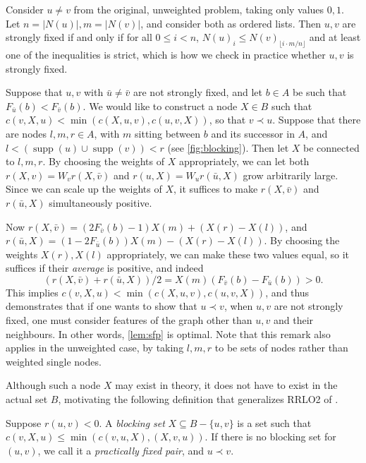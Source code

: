 \documentclass[a4paper,UKenglish,cleveref, autoref, thm-restate]{lipics-v2021}
\renewcommand{\b}{\prec}
\DeclareMathOperator{\supp}{supp}
\begin{document}
\begin{remark}
    Consider $u \neq v$ from the original, unweighted problem, taking only values $0, 1$. Let 
    $n = |N(u)|, m = |N(v)|$, and consider both as ordered lists. Then $u, v$ are strongly
    fixed if and only if for all $0 \leq i < n$, $N(u)_i \leq N(v)_{\lfloor i\cdot m/n
    \rfloor}$ and at least one of the inequalities is strict, which is how we check in practice
    whether $u, v$ is strongly fixed.
\end{remark}

\begin{remark}\label{rem:strongest}
    Suppose that $u, v$ with $\bar u \neq \bar v$ are not strongly fixed, and let $b \in A$ be
    such that $F_{\bar u}(b) < F_{\bar v}(b)$.
    We would like to construct a node $X\in B$ such that $c(v, X, u) < \min(c(X,
    u, v), c(u, v, X))$, so that $v\b u$.
    Suppose that there are nodes $l, m,
    r \in A$, with $m$ sitting between $b$ and its successor in $A$, and $l < (\supp(u) \cup
    \supp(v)) < r$ (see \cref{fig:blocking}). Then let $X$ be connected to $l, m, r$. By choosing
    the weights of $X$ appropriately, we can let both $r(X, v) = W_v r(X, \bar v)$ and $r(u, X)
    = W_u r(\bar u, X)$ grow arbitrarily large. Since we can scale up the weights of $X$, it
    suffices to make $r(X, \bar v)$ and $r(\bar u, X)$ simultaneously positive.

    Now $r(X, \bar v) = (2F_{\bar v}(b) - 1)X(m) + (X(r) - X(l))$, and $r(\bar u, X) = (1 -
    2F_{\bar u}(b))X(m) - (X(r) - X(l))$. By choosing the weights $X(r), X(l)$ appropriately, we can make
    these two values equal, so it suffices if their \emph{average} is positive, and indeed
    $${(r(X, \bar v) + r(\bar u, X))/2 = X(m)(F_{\bar v}(b) - F_{\bar u}(b)) > 0}.$$
    This implies $c(v, X, u) < \min(c(X, u, v), c(u, v, X))$, and thus
    demonstrates that if one wants to show that $u \b v$, when $u,
    v$ are not strongly fixed, one must consider features of the graph other than $u, v$ and
    their neighbours. In other words, \cref{lem:sfp} is optimal. Note that this remark also
    applies in the unweighted case, by taking $l, m, r$ to be sets of nodes rather than
    weighted single nodes.
\end{remark}

Although such a node $X$ may exist in theory, it does
not have to exist in the actual set $B$, motivating the following definition
that generalizes RRLO2 of \cite{dujmovic_2008}.

\begin{lemma}\label{pfp}
  Suppose $r(u,v)< 0$.
    A \emph{blocking set} $X\subseteq B-\{u,v\}$ is a set such that $c(v,X,u) \leq \min(c(v, u,
    X), (X, v, u))$.  If there is no blocking set for $(u, v)$, we call it a
    \emph{practically fixed pair}, and $u\b v$.
\end{lemma}
\end{document}
